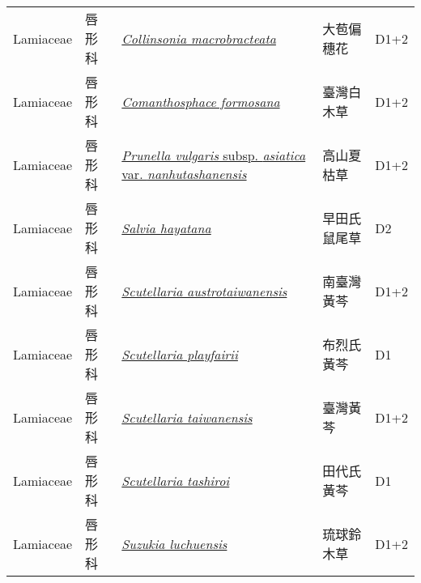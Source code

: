 {\begin{longtable}{p{2.5cm}p{2.5cm}p{4.5cm}p{2.5cm}p{3cm}}
    Lamiaceae & 唇形科 & \href{http://www.theplantlist.org/tpl1.1/search?q=Collinsonia+macrobracteata}{\textit{Collinsonia macrobracteata} } & 大苞偏穗花 & D1+2 \index{Collinsonia@\textit{Collinsonia}!macrobracteata@\textit{macrobracteata}}  \index{大苞偏穗花} \\
    Lamiaceae & 唇形科 & \href{http://www.theplantlist.org/tpl1.1/search?q=Comanthosphace+formosana}{\textit{Comanthosphace formosana} } & 臺灣白木草 & D1+2 \index{Comanthosphace@\textit{Comanthosphace}!formosana@\textit{formosana}}  \index{臺灣白木草} \\
    Lamiaceae & 唇形科 & \href{http://www.theplantlist.org/tpl1.1/search?q=Prunella+vulgaris+subsp.+asiatica+var.+nanhutashanensis}{\textit{Prunella vulgaris} subsp. \textit{asiatica} var. \textit{nanhutashanensis} } & 高山夏枯草 & D1+2 \index{Prunella@\textit{Prunella}!vulgaris@\textit{vulgaris}!subsp. asiatica@subsp. \textit{asiatica}!var. nanhutashanensis@var. \textit{nanhutashanensis}}  \index{高山夏枯草} \\
    Lamiaceae & 唇形科 & \href{http://www.theplantlist.org/tpl1.1/search?q=Salvia+hayatana}{\textit{Salvia hayatana} } & 早田氏鼠尾草 & D2　 \index{Salvia@\textit{Salvia}!hayatana@\textit{hayatana}}  \index{早田氏鼠尾草} \\
    Lamiaceae & 唇形科 & \href{http://www.theplantlist.org/tpl1.1/search?q=Scutellaria+austrotaiwanensis}{\textit{Scutellaria austrotaiwanensis} } & 南臺灣黃芩 & D1+2 \index{Scutellaria@\textit{Scutellaria}!austrotaiwanensis@\textit{austrotaiwanensis}}  \index{南臺灣黃芩} \\
    Lamiaceae & 唇形科 & \href{http://www.theplantlist.org/tpl1.1/search?q=Scutellaria+playfairii}{\textit{Scutellaria playfairii} } & 布烈氏黃芩 & D1 \index{Scutellaria@\textit{Scutellaria}!playfairii@\textit{playfairii}}  \index{布烈氏黃芩} \\
    Lamiaceae & 唇形科 & \href{http://www.theplantlist.org/tpl1.1/search?q=Scutellaria+taiwanensis}{\textit{Scutellaria taiwanensis} } & 臺灣黃芩 & D1+2 \index{Scutellaria@\textit{Scutellaria}!taiwanensis@\textit{taiwanensis}}  \index{臺灣黃芩} \\
    Lamiaceae & 唇形科 & \href{http://www.theplantlist.org/tpl1.1/search?q=Scutellaria+tashiroi}{\textit{Scutellaria tashiroi} } & 田代氏黃芩 & D1 \index{Scutellaria@\textit{Scutellaria}!tashiroi@\textit{tashiroi}}  \index{田代氏黃芩} \\
    Lamiaceae & 唇形科 & \href{http://www.theplantlist.org/tpl1.1/search?q=Suzukia+luchuensis}{\textit{Suzukia luchuensis} } & 琉球鈴木草 & D1+2 \index{Suzukia@\textit{Suzukia}!luchuensis@\textit{luchuensis}}  \index{琉球鈴木草} \\

\end{longtable}}
